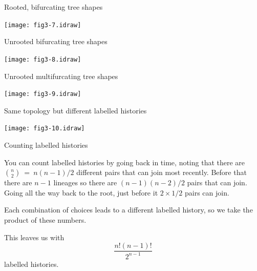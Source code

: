\documentclass[bluish,slideColor,colorBG,pdf]{prosper}
\begin{document}
\begin{slide}[Replace]{Rooted, bifurcating tree shapes}

\centerline{\texttt{[image: fig3-7.idraw]}}

\end{slide}

\begin{slide}[Replace]{Unrooted bifurcating tree shapes}

\centerline{\texttt{[image: fig3-8.idraw]}}

\end{slide}

\begin{slide}[Replace]{Unrooted multifurcating tree shapes}

\centerline{\texttt{[image: fig3-9.idraw]}}

\end{slide}

\begin{slide}[Replace]{Same topology but different labelled histories}
\bigskip

\centerline{\texttt{[image: fig3-10.idraw]}}

\end{slide}

\begin{slide}[Replace]{Counting labelled histories}
\bigskip

You can count labelled histories by going back in time, noting that there are
${n \choose 2} \ = \ n(n-1)/2$
different pairs that can join most recently.  Before that there are $n-1$
lineages so there are $(n-1)(n-2)/2$ pairs that can join.  Going all the
way back to the root, just before it $2\times 1/2$ pairs can join. 
\bigskip

Each combination of choices leads to a different labelled history, so we
take the product of these numbers.
\bigskip

This leaves us with
\[
\frac{n! (n-1)!}{2^{n-1}}
\]
labelled histories.

\end{slide}
\end{document}

